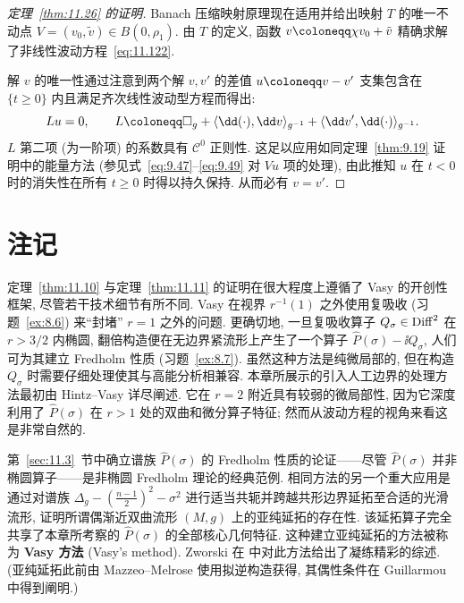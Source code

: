 \begin{proof}[定理~\ref{thm:11.26} 的证明]
Banach 压缩映射原理现在适用并给出映射 $T$ 的唯一不动点 $V = (v_0, \tilde v) \in B(0, \rho_1)$. 由 $T$ 的定义, 函数 $v \defeq \chi v_0 + \tilde v$ 精确求解了非线性波动方程~\eqref{eq:11.122}.

解 $v$ 的唯一性通过注意到两个解 $v, v'$ 的差值 $u \defeq v - v'$ 支集包含在 $\{t \ge 0\}$ 内且满足齐次线性波动型方程而得出:
\begin{equation}\label{eq:11.127}
    L u = 0, \qquad L \defeq \Box_g + \langle \dd(\cdot), \dd v \rangle_{g^{-1}} + \langle \dd v', \dd(\cdot) \rangle_{g^{-1}}.
\end{equation}
$L$ 第二项 (为一阶项) 的系数具有 $\mathcal{C}^0$ 正则性. 这足以应用如同定理~\ref{thm:9.19} 证明中的能量方法 (参见式~\eqref{eq:9.47}--\eqref{eq:9.49} 对 $V u$ 项的处理), 由此推知 $u$ 在 $t < 0$ 时的消失性在所有 $t \ge 0$ 时得以持久保持. 从而必有 $v = v'$.
\end{proof}

\section*{注记}

定理~\ref{thm:11.10} 与定理~\ref{thm:11.11} 的证明在很大程度上遵循了 Vasy \cite{Vas13} 的开创性框架, 尽管若干技术细节有所不同. Vasy 在视界 $r^{-1}(1)$ 之外使用复吸收 (习题~\ref{ex:8.6}) 来“封堵” $r = 1$ 之外的问题. 更确切地, 一旦复吸收算子 $Q_\sigma \in \operatorname{Diff}^2$ 在 $r > 3/2$ 内椭圆, 翻倍构造便在无边界紧流形上产生了一个算子 $\widehat{P}(\sigma) - \ii Q_\sigma$, 人们可为其建立 Fredholm 性质 (习题~\ref{ex:8.7}). 虽然这种方法是纯微局部的, 但在构造 $Q_\sigma$ 时需要仔细处理使其与高能分析相兼容. 本章所展示的引入人工边界的处理方法最初由 Hintz--Vasy \cite{HV15} 详尽阐述. 它在 $r = 2$ 附近具有较弱的微局部性, 因为它深度利用了 $\widehat{P}(\sigma)$ 在 $r > 1$ 处的双曲和微分算子特征; 然而从波动方程的视角来看这是非常自然的.

第~\ref{sec:11.3}~节中确立谱族 $\widehat{P}(\sigma)$ 的 Fredholm 性质的论证——尽管 $\widehat{P}(\sigma)$ 并非椭圆算子——是非椭圆 Fredholm 理论的经典范例. 相同方法的另一个重大应用是通过对谱族 $\Delta_g - (\frac{n-1}{2})^2 - \sigma^2$ 进行适当共轭并跨越共形边界延拓至合适的光滑流形, 证明所谓偶渐近双曲流形 $(M, g)$ 上的亚纯延拓的存在性. 该延拓算子完全共享了本章所考察的 $\widehat{P}(\sigma)$ 的全部核心几何特征. 这种建立亚纯延拓的方法被称为 \textbf{Vasy 方法} (Vasy's method). Zworski 在 \cite{Zwo16} 中对此方法给出了凝练精彩的综述. (亚纯延拓此前由 Mazzeo--Melrose \cite{MM87} 使用拟逆构造获得, 其偶性条件在 Guillarmou \cite{Gui05} 中得到阐明.)

